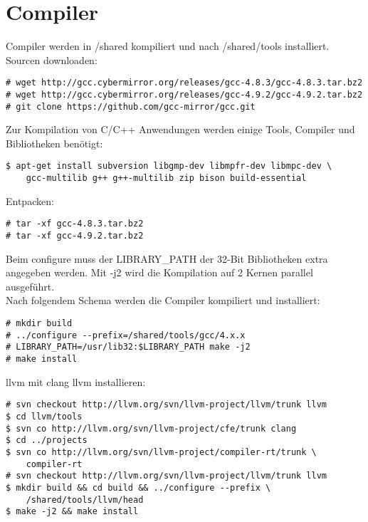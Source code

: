 \chapter{Compiler}
Compiler werden in /shared kompiliert und nach /shared/tools installiert.\\
Sourcen downloaden:
\begin{lstlisting}[style=Bash]
# wget http://gcc.cybermirror.org/releases/gcc-4.8.3/gcc-4.8.3.tar.bz2
# wget http://gcc.cybermirror.org/releases/gcc-4.9.2/gcc-4.9.2.tar.bz2
# git clone https://github.com/gcc-mirror/gcc.git
\end{lstlisting}
Zur Kompilation von C/C++ Anwendungen werden einige Tools, Compiler und Bibliotheken benötigt:
\begin{lstlisting}[style=Bash]
$ apt-get install subversion libgmp-dev libmpfr-dev libmpc-dev \
	gcc-multilib g++ g++-multilib zip bison build-essential
\end{lstlisting}
Entpacken:
\begin{lstlisting}[style=Bash]
# tar -xf gcc-4.8.3.tar.bz2
# tar -xf gcc-4.9.2.tar.bz2
\end{lstlisting}
Beim configure muss der LIBRARY\_PATH der 32-Bit Bibliotheken extra angegeben werden.
Mit -j2 wird die Kompilation auf 2 Kernen parallel ausgeführt.\\
Nach folgendem Schema werden die Compiler kompiliert und installiert:
\begin{lstlisting}[style=Bash]
# mkdir build 
# ../configure --prefix=/shared/tools/gcc/4.x.x
# LIBRARY_PATH=/usr/lib32:$LIBRARY_PATH make -j2
# make install
\end{lstlisting}
llvm mit clang llvm installieren:
\begin{lstlisting}[style=Bash]
# svn checkout http://llvm.org/svn/llvm-project/llvm/trunk llvm
$ cd llvm/tools
$ svn co http://llvm.org/svn/llvm-project/cfe/trunk clang
$ cd ../projects
$ svn co http://llvm.org/svn/llvm-project/compiler-rt/trunk \
	compiler-rt
# svn checkout http://llvm.org/svn/llvm-project/llvm/trunk llvm
$ mkdir build && cd build && ../configure --prefix \
	/shared/tools/llvm/head
$ make -j2 && make install
\end{lstlisting}
